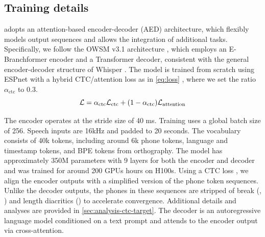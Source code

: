 \subsection{Training details}
\POWSM adopts an attention-based encoder-decoder (AED) architecture, which flexibly models output sequences and allows the integration of additional tasks.
Specifically, we follow the OWSM v3.1 architecture \cite{peng24b_interspeech}, which employs an E-Branchformer encoder and a Transformer decoder, consistent with the general encoder-decoder structure of Whisper \cite{radford2023robust}. The model is trained from scratch using ESPnet \cite{watanabe2018espnet} with a hybrid CTC/attention loss as in \autoref{eq:loss} \cite{watanabe2017hybridctc}, where we set the ratio $\alpha_\text{ctc}$ to 0.3.
\begin{equation}
\label{eq:loss}\small
    \mathcal{L} = \alpha_\text{ctc} \mathcal{L}_{\text{ctc}} + (1 - \alpha_\text{ctc}) \mathcal{L}_{\text{attention}}
\end{equation}

The encoder operates at the stride size of 40 ms. Training uses a global batch size of 256. Speech inputs are 16kHz and padded to 20 seconds. The vocabulary consists of 40k tokens, including around 6k phone tokens, language and timestamp tokens, and BPE tokens from orthography. 
The model has approximately 350M parameters with 9 layers for both the encoder and decoder and was trained for around 200 GPUs hours on H100s.
Using a CTC loss \citep{graves2006connectionist}, we align the encoder outputs with a simplified version of the phone token sequences. Unlike the decoder outputs, the phones in these sequences are stripped of break (, \textipa{/\t*{}/})
and length diacritics () to accelerate convergence. Additional details and analyses are provided in \autoref{sec:analysis-ctc-target}. 
The decoder is an autoregressive language model conditioned on a text prompt and attends to the encoder output via cross-attention.

